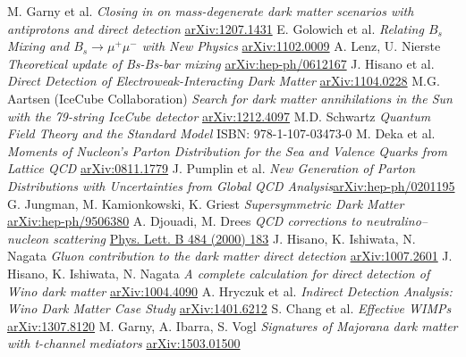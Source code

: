 \begin{thebibliography}{xxx}
 M. Garny et al. \textit{Closing in on mass-degenerate dark matter scenarios with antiprotons and direct detection} \href{https://arxiv.org/abs/1207.1431}{arXiv:1207.1431}
 E. Golowich et al. \textit{Relating $B_s$ Mixing and $B_s \rightarrow \mu^+ \mu^-$ with New Physics} \href{https://arxiv.org/abs/1102.0009}{arXiv:1102.0009}
 A. Lenz, U. Nierste \textit{Theoretical update of Bs-Bs-bar mixing} \href{https://arxiv.org/abs/hep-ph/0612167}{arXiv:hep-ph/0612167}
  J. Hisano et al. \textit{Direct Detection of Electroweak-Interacting Dark Matter} \href{https://arxiv.org/abs/1104.0228v2}{arXiv:1104.0228}
 M.G. Aartsen (IceCube Collaboration) \textit{Search for dark matter annihilations in the Sun with the 79-string IceCube detector} \href{https://arxiv.org/abs/1212.4097}{arXiv:1212.4097}
 M.D. Schwartz \textit{Quantum Field Theory and the Standard Model} ISBN: 978-1-107-03473-0
 M. Deka et al. \textit{Moments of Nucleon's Parton Distribution for the Sea and Valence Quarks from Lattice QCD} \href{https://arxiv.org/abs/0811.1779}{arXiv:0811.1779}
 J. Pumplin et al. \textit{New Generation of Parton Distributions with Uncertainties from Global QCD Analysis}\href{https://arxiv.org/abs/hep-ph/0201195}{arXiv:hep-ph/0201195}
 G. Jungman, M. Kamionkowski, K. Griest \textit{Supersymmetric Dark Matter} \href{https://arxiv.org/abs/hep-ph/9506380}{arXiv:hep-ph/9506380}
 A. Djouadi, M. Drees \textit{QCD corrections to neutralino–nucleon scattering} \href{http://www.sciencedirect.com/science/journal/03702693/484}{Phys. Lett. B 484 (2000) 183}
 J. Hisano, K. Ishiwata, N. Nagata \textit{Gluon contribution to the dark matter direct detection}  \href{https://arxiv.org/abs/1007.2601}{arXiv:1007.2601}
 J. Hisano, K. Ishiwata, N. Nagata \textit{A complete calculation for direct detection of Wino dark matter}  \href{https://arxiv.org/abs/1004.4090}{arXiv:1004.4090}
 A. Hryczuk et al. \textit{Indirect Detection Analysis: Wino Dark Matter Case Study} \href{https://arxiv.org/abs/1401.6212v2}{arXiv:1401.6212}
 S. Chang et al. \textit{Effective WIMPs}  \href{https://arxiv.org/abs/1307.8120}{arXiv:1307.8120}
 M. Garny, A. Ibarra, S. Vogl \textit{Signatures of Majorana dark matter with t-channel mediators} \href{https://arxiv.org/abs/1503.01500}{arXiv:1503.01500}

\end{thebibliography}
